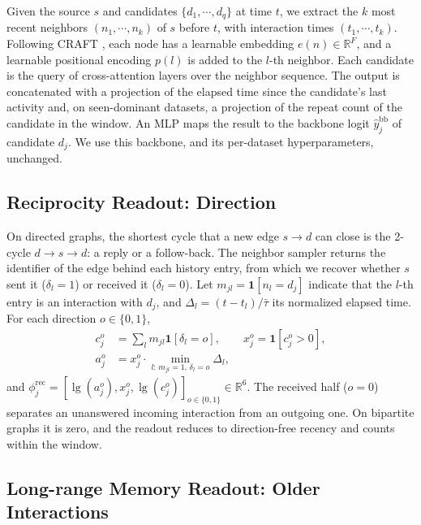 \documentclass[twoside]{article}
\newcommand{\R}{\mathbb{R}}
\newcommand{\lone}{\operatorname{lg}}
\begin{document}
Given the source $s$ and candidates $\{d_1,\cdots,d_q\}$ at time $t$, we extract the $k$ most recent neighbors $(n_1,\cdots,n_k)$ of $s$ before $t$, with interaction times $(t_1,\cdots,t_k)$. Following CRAFT \citep{yi2025craft}, each node has a learnable embedding $e(n)\in\R^{F}$, and a learnable positional encoding $p(l)$ is added to the $l$-th neighbor. Each candidate is the query of cross-attention layers \citep{vaswani2017attention} over the neighbor sequence. The output is concatenated with a projection of the elapsed time since the candidate's last activity and, on seen-dominant datasets, a projection of the repeat count of the candidate in the window. An MLP maps the result to the backbone logit $\hat{y}^{\mathrm{bb}}_j$ of candidate $d_j$. We use this backbone, and its per-dataset hyperparameters, unchanged.

\subsection{Reciprocity Readout: Direction}
\label{sec:recip}

On directed graphs, the shortest cycle that a new edge $s\to d$ can close is the 2-cycle $d\to s\to d$: a reply or a follow-back. The neighbor sampler returns the identifier of the edge behind each history entry, from which we recover whether $s$ sent it ($\delta_l=1$) or received it ($\delta_l=0$). Let $m_{jl}=\mathbf{1}[n_l=d_j]$ indicate that the $l$-th entry is an interaction with $d_j$, and $\Delta_l=(t-t_l)/\bar{\tau}$ its normalized elapsed time. For each direction $o\in\{0,1\}$,
\begin{equation}
\begin{aligned}
c^{o}_j&=\textstyle\sum_{l}m_{jl}\mathbf{1}[\delta_l=o],\qquad x^{o}_j=\mathbf{1}[c^{o}_j>0],\\
a^{o}_j&=x^{o}_j\cdot\min_{l:\,m_{jl}=1,\,\delta_l=o}\Delta_l,
\end{aligned}
\end{equation}
and $\phi^{\mathrm{rec}}_j=[\lone(a^{o}_j),x^{o}_j,\lone(c^{o}_j)]_{o\in\{0,1\}}\in\R^{6}$. The received half ($o=0$) separates an unanswered incoming interaction from an outgoing one. On bipartite graphs it is zero, and the readout reduces to direction-free recency and counts within the window.

\subsection{Long-range Memory Readout: Older Interactions}
\label{sec:memory}
\end{document}
